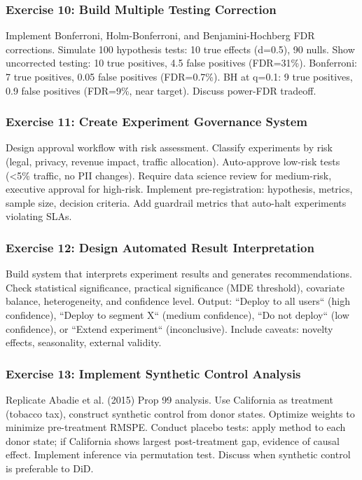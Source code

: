 \subsubsection{Exercise 10: Build Multiple Testing Correction}

Implement Bonferroni, Holm-Bonferroni, and Benjamini-Hochberg FDR corrections. Simulate 100 hypothesis tests: 10 true effects (d=0.5), 90 nulls. Show uncorrected testing: 10 true positives, 4.5 false positives (FDR=31\%). Bonferroni: 7 true positives, 0.05 false positives (FDR=0.7\%). BH at q=0.1: 9 true positives, 0.9 false positives (FDR=9\%, near target). Discuss power-FDR tradeoff.

\subsubsection{Exercise 11: Create Experiment Governance System}

Design approval workflow with risk assessment. Classify experiments by risk (legal, privacy, revenue impact, traffic allocation). Auto-approve low-risk tests (<5\% traffic, no PII changes). Require data science review for medium-risk, executive approval for high-risk. Implement pre-registration: hypothesis, metrics, sample size, decision criteria. Add guardrail metrics that auto-halt experiments violating SLAs.

\subsubsection{Exercise 12: Design Automated Result Interpretation}

Build system that interprets experiment results and generates recommendations. Check statistical significance, practical significance (MDE threshold), covariate balance, heterogeneity, and confidence level. Output: ``Deploy to all users`` (high confidence), ``Deploy to segment X`` (medium confidence), ``Do not deploy`` (low confidence), or ``Extend experiment`` (inconclusive). Include caveats: novelty effects, seasonality, external validity.

\subsubsection{Exercise 13: Implement Synthetic Control Analysis}

Replicate Abadie et al. (2015) Prop 99 analysis. Use California as treatment (tobacco tax), construct synthetic control from donor states. Optimize weights to minimize pre-treatment RMSPE. Conduct placebo tests: apply method to each donor state; if California shows largest post-treatment gap, evidence of causal effect. Implement inference via permutation test. Discuss when synthetic control is preferable to DiD.

